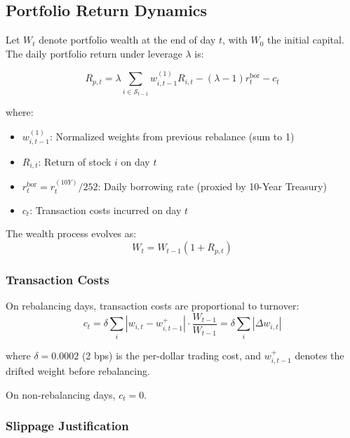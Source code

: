 \documentclass[12pt,a4paper]{article}
\theoremstyle{definition}
\begin{document}
\subsection{Portfolio Return Dynamics}

Let $W_t$ denote portfolio wealth at the end of day $t$, with $W_0$ the initial capital. The daily portfolio return under leverage $\lambda$ is:

\begin{equation}
R_{p,t} = \lambda \sum_{i \in \mathcal{S}_{t-1}} w^{(1)}_{i,t-1} R_{i,t} - (\lambda - 1) r^{\text{bor}}_t - c_t
\label{eq:portfolio_return}
\end{equation}

where:
\begin{itemize}
    \item $w^{(1)}_{i,t-1}$: Normalized weights from previous rebalance (sum to 1)
    \item $R_{i,t}$: Return of stock $i$ on day $t$
    \item $r^{\text{bor}}_t = r^{(10Y)}_t / 252$: Daily borrowing rate (proxied by 10-Year Treasury)
    \item $c_t$: Transaction costs incurred on day $t$
\end{itemize}

The wealth process evolves as:
\begin{equation}
W_t = W_{t-1}(1 + R_{p,t})
\label{eq:wealth_process}
\end{equation}

\subsubsection{Transaction Costs}

On rebalancing days, transaction costs are proportional to turnover:
\begin{equation}
c_t = \delta \sum_{i} |w_{i,t} - w_{i,t-1}^{+}| \cdot \frac{W_{t-1}}{W_{t-1}} = \delta \sum_{i} |\Delta w_{i,t}|
\label{eq:transaction_costs}
\end{equation}

where $\delta = 0.0002$ (2 bps) is the per-dollar trading cost, and $w_{i,t-1}^{+}$ denotes the drifted weight before rebalancing.

On non-rebalancing days, $c_t = 0$.

\subsubsection{Slippage Justification}
\end{document}
